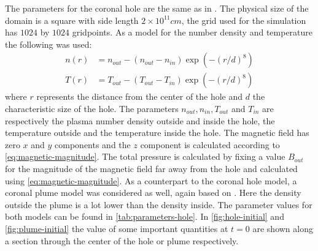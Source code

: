 The parameters for the coronal hole are the same as in \cite{coronal-hole}. 
The physical size of the domain is a square with side length $2\times 10^{11}cm$, the grid used for the simulation has $1024$ by $1024$ gridpoints. As a model for the number density and temperature the following was used:
\begin{equation}
	\label{eq:hole-model}
	\begin{split}
		n(r) &= n_{out} - (n_{out}-n_{in})\exp \left( -(r/d)^8 \right)\\
		T(r) &= T_{out} - (T_{out}-T_{in})\exp \left( -(r/d)^8 \right) 
	\end{split}
\end{equation}
where $r$ represents the distance from the center of the hole and $d$ the characteristic size of the hole. 
The parameters $n_{out}, n_{in}, T_{out}$ and $T_{in}$ are respectively the plasma number density outside and inside the hole, the temperature outside and the temperature inside the hole. 
The magnetic field has zero $x$ and $y$ components and the $z$ component is calculated according to \cref{eq:magnetic-magnitude}.
The total pressure is calculated by fixing a value $B_{out}$ for the magnitude of the magnetic field far away from the hole and calculated using \cref{eq:magnetic-magnitude}.
As a counterpart to the coronal hole model, a coronal plume model was considered as well, again based on \cite{coronal-hole}.
Here the density outside the plume is a lot lower than the density inside.
The parameter values for both models can be found in \cref{tab:parameters-hole}.
In \cref{fig:hole-initial} and \cref{fig:plume-initial} the value of some important quantities at $t=0$ are shown along a section through the center of the hole or plume respectively.


